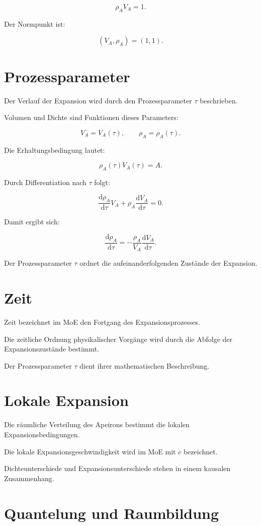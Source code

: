 \documentclass[11pt,a4paper]{article}
\begin{document}
\[
\rho_A V_A=1.
\]

Der Normpunkt ist:

\[
(V_A,\rho_A)=(1,1).
\]

\section*{Prozessparameter}

Der Verlauf der Expansion
wird durch den Prozessparameter
$\tau$ beschrieben.

Volumen und Dichte sind
Funktionen dieses Parameters:

\[
V_A=V_A(\tau),
\qquad
\rho_A=\rho_A(\tau).
\]

Die Erhaltungsbedingung lautet:

\[
\rho_A(\tau)V_A(\tau)=A.
\]

Durch Differentiation nach
$\tau$ folgt:

\[
\frac{\mathrm{d}\rho_A}
{\mathrm{d}\tau}V_A
+
\rho_A
\frac{\mathrm{d}V_A}
{\mathrm{d}\tau}
=0.
\]

Damit ergibt sich:

\[
\frac{\mathrm{d}\rho_A}
{\mathrm{d}\tau}
=
-\frac{\rho_A}{V_A}
\frac{\mathrm{d}V_A}
{\mathrm{d}\tau}.
\]

Der Prozessparameter $\tau$
ordnet die aufeinanderfolgenden
Zustände der Expansion.

\section*{Zeit}

Zeit bezeichnet im MoE den
Fortgang des Expansionsprozesses.

Die zeitliche Ordnung physikalischer
Vorgänge wird durch die Abfolge
der Expansionszustände bestimmt.

Der Prozessparameter $\tau$
dient ihrer mathematischen
Beschreibung.

\section*{Lokale Expansion}

Die räumliche Verteilung
des Apeirons bestimmt die
lokalen Expansionsbedingungen.

Die lokale Expansionsgeschwindigkeit
wird im MoE mit $c$ bezeichnet.

Dichteunterschiede und
Expansionsunterschiede stehen
in einem kausalen Zusammenhang.

\section*{Quantelung und Raumbildung}
\end{document}
